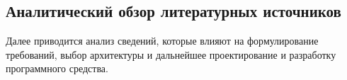 \subsection{Аналитический обзор литературных источников}
\label{sec:analysis:research}

Далее приводится анализ сведений, которые влияют на формулирование требований, выбор архитектуры и дальнейшее проектирование и разработку программного средства.



